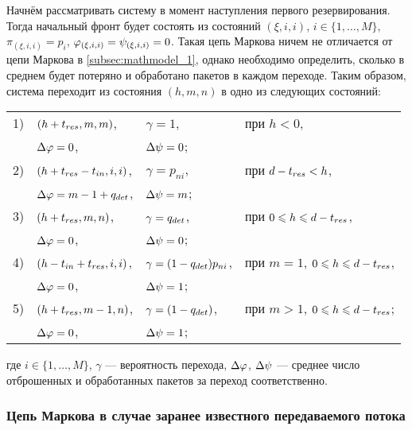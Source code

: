 Начнём рассматривать систему в момент наступления первого резервирования. Тогда начальный фронт будет состоять из состояний $(\xi, i, i)$, $i \in \{ 1, \ldots, M \}$, $\pi_{(\xi, i, i)} = p_i$, $\varphi_{(\xi, i, i)} = \psi_{(\xi, i, i)} = 0$. Такая цепь Маркова ничем не отличается от цепи Маркова в \ref{subsec:mathmodel_1}, однако необходимо определить, сколько в среднем будет потеряно и обработано пакетов в каждом переходе. Таким образом, система  переходит из состояния $(h, m, n)$ в одно из следующих состояний:

\begin{tabular}{l l l l}
\label{mathmodel2_tab}
1)	&$(h + t_{res}, m, m)$,	&$\gamma = 1$,	&при $h < 0$,\\
	&$\Delta\varphi = 0$,		&$\Delta\psi = 0$;\\
2)	&$(h + t_{res} - t_{in}, i, i)$,	&$\gamma = p_{ni}$,	&при $d - t_{res}< h$,\\
	&$\Delta\varphi = m - 1 + q_{det}$,	&$\Delta\psi = m$;\\
3)	&$(h + t_{res}, m, n)$,	&$\gamma = q_{det}$,	&при $0 \leqslant h \leqslant d - t_{res}$,\\
	&$\Delta\varphi = 0$,		&$\Delta\psi = 0$;\\
4)	&$(h - t_{in} + t_{res}, i, i)$,	&$\gamma = ( 1 - q_{det}) p_{ni}$,	&при $m = 1$, $0 \leqslant h \leqslant d - t_{res}$,\\
	&$\Delta\varphi = 0$,		&$\Delta\psi = 1$;\\
5)	&$(h + t_{res}, m - 1, n)$,	&$\gamma = ( 1 - q_{det})$,	&при $m > 1$, $0 \leqslant h \leqslant d - t_{res}$;\\
	&$\Delta\varphi = 0$,		&$\Delta\psi = 1$;\\
\end{tabular} \newline
где $i\in\{1,\ldots,M\}$, $\gamma$ --- вероятность перехода, 	$\Delta\varphi$, $\Delta\psi$ --- среднее число отброшенных и обработанных пакетов за переход соответственно.


\subsubsection{Цепь Маркова в случае заранее известного передаваемого потока}
\label{subsec:mathmodel_2_know}

